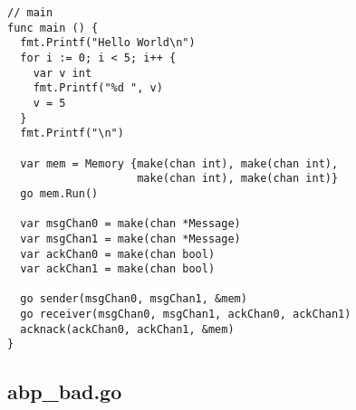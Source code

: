 \begin{lstlisting}[breaklines]
// main
func main () {
  fmt.Printf("Hello World\n")
  for i := 0; i < 5; i++ {
    var v int
    fmt.Printf("%d ", v)
    v = 5
  }
  fmt.Printf("\n")

  var mem = Memory {make(chan int), make(chan int),
                    make(chan int), make(chan int)}
  go mem.Run()

  var msgChan0 = make(chan *Message)
  var msgChan1 = make(chan *Message)
  var ackChan0 = make(chan bool)
  var ackChan1 = make(chan bool)

  go sender(msgChan0, msgChan1, &mem)
  go receiver(msgChan0, msgChan1, ackChan0, ackChan1)
  acknack(ackChan0, ackChan1, &mem)
}
\end{lstlisting}

\subsection{abp\_bad.go}\label{sec:bad-abp-prog}
